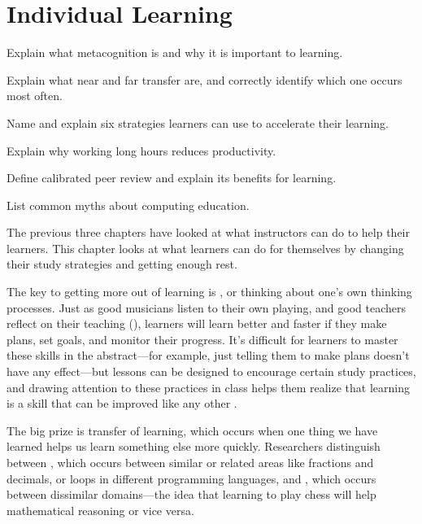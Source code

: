 \chapter{Individual Learning}\label{s:individual}

\begin{objectives}

\item Explain what metacognition is and why it is important to
  learning.

\item Explain what near and far transfer are, and correctly identify
  which one occurs most often.

\item Name and explain six strategies learners can use to accelerate
  their learning.

\item Explain why working long hours reduces productivity.

\item Define calibrated peer review and explain its benefits for
  learning.

\item List common myths about computing education.

\end{objectives}

The previous three chapters have looked at what instructors can do to
help their learners.  This chapter looks at what learners can do for
themselves by changing their study strategies and getting enough rest.

The key to getting more out of learning is
, or thinking about one's own
thinking processes. Just as good musicians listen to their own
playing, and good teachers reflect on their teaching
(), learners will learn better and faster if
they make plans, set goals, and monitor their progress.  It's
difficult for learners to master these skills in the abstract---for
example, just telling them to make plans doesn't have any effect---but
lessons can be designed to encourage certain study practices, and
drawing attention to these practices in class helps them realize that
learning is a skill that can be improved like any other
\cite{McGu2015,Miya2018}.

The big prize is transfer of learning, which occurs when one thing we
have learned helps us learn something else more quickly.  Researchers
distinguish between , which
occurs between similar or related areas like fractions and decimals,
or loops in different programming languages, and
, which occurs between
dissimilar domains---the idea that learning to play chess will help
mathematical reasoning or vice versa.

